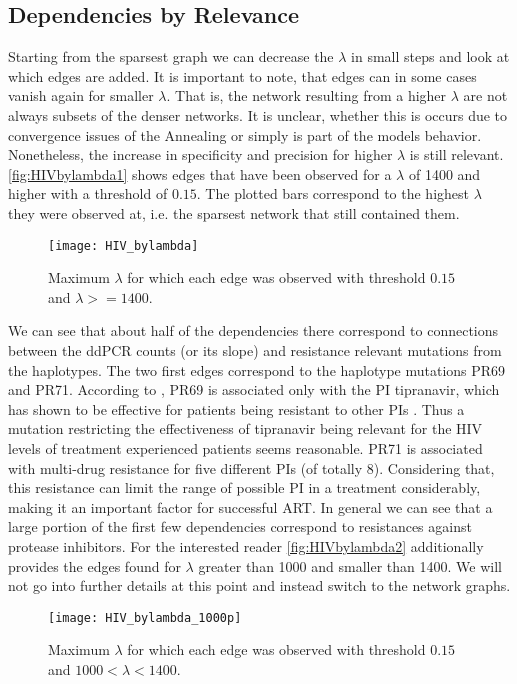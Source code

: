 \subsection{Dependencies by Relevance}
Starting from the sparsest graph we can decrease the $\lambda$ in small steps and look at which edges are added.
It is important to note, that edges can in some cases vanish again for smaller $\lambda$.
That is, the network resulting from a higher $\lambda$ are not always subsets of the denser networks.
It is unclear, whether this is occurs due to convergence issues of the Annealing or simply is part of the models behavior.
Nonetheless, the increase in specificity and precision for higher $\lambda$ is still relevant.
\autoref{fig:HIVbylambda1} shows edges that have been observed for a $\lambda$ of 1400 and higher with a threshold of $0.15$.
The plotted bars correspond to the highest $\lambda$ they were observed at, i.e. the sparsest network that still contained them.

\begin{figure}
	\centering
	\texttt{[image: HIV\_bylambda]}
	\caption{Maximum $\lambda$ for which each edge was observed with threshold $0.15$ and $\lambda>=1400$.}
	\label{fig:HIVbylambda1}
	
\end{figure}
We can see that about half of the dependencies there correspond to connections between the ddPCR counts (or its slope) and resistance relevant mutations from the haplotypes.
The two first edges correspond to the haplotype mutations PR69 and PR71.
According to \cite{shafer2017human}, PR69 is associated only with the \gls{PI} tipranavir,
which has shown to be effective for patients being resistant to other PIs \citep{doyon2005selection}.
Thus a mutation restricting the effectiveness of tipranavir being relevant for the HIV levels of treatment experienced patients seems reasonable.
PR71 is associated with multi-drug resistance for five different \gls{PI}s (of totally 8).
Considering that, this resistance can limit the range of possible \gls{PI} in a treatment considerably, making it an important factor for successful \gls{ART}.
In general we can see that a large portion of the first few dependencies correspond to resistances against protease inhibitors.
For the interested reader \autoref{fig:HIVbylambda2} additionally provides the edges found for $\lambda$ greater than 1000 and smaller than 1400.
We will not go into further details at this point and instead switch to the network graphs.
\begin{figure}[H]
	\centering
	\texttt{[image: HIV\_bylambda\_1000p]}
	\caption{Maximum $\lambda$ for which each edge was observed with threshold $0.15$ and $1000<\lambda<1400$.}
	\label{fig:HIVbylambda2}
	
\end{figure}
